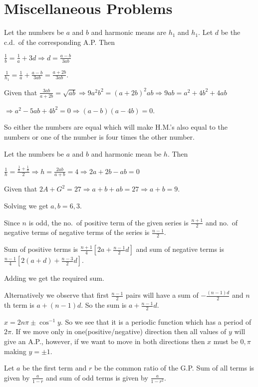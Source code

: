 \chapter{Miscellaneous Problems}
\startitemize[n, 1*broad]
\item Let the numbers be $a$ and $b$ and harmonic means are $h_1$ and $h_1$. Let $d$ be the c.d.\ of the
  corresponding A.P. Then

  $\frac{1}{b} = \frac{1}{a} + 3d\Rightarrow d = \frac{a - b}{3ab}$

  $\frac{1}{h_1} = \frac{1}{a} + \frac{a - b}{3ab} = \frac{a + 2b}{3ab}$.

  Given that $\frac{3ab}{a + 2b} = \sqrt{ab}\Rightarrow 9a^2b^2 = (a + 2b)^2ab \Rightarrow 9ab = a^2 + 4b^2
  + 4ab$

  $\Rightarrow a^2 - 5ab + 4b^2 = 0 \Rightarrow (a - b)(a - 4b) = 0$.

  So either the numbers are equal which will make H.M.'s also equal to the numbers or one of the number is
  four times the other number.
\item Let the numbers be $a$ and $b$ and harmonic mean be $h$. Then

  $\frac{1}{h} = \frac{\frac{1}{a} + \frac{1}{b}}{2} \Rightarrow h = \frac{2ab}{a + b} = 4 \Rightarrow 2a +
  2b - ab = 0$

  Given that $2A + G^2 = 27 \Rightarrow a + b + ab = 27 \Rightarrow a + b = 9$.

  Solving we get $a, b = 6, 3$.
\item Since $n$ is odd, the no.\ of positive term of the given series is $\frac{n + 1}{2}$ and no.\ of
  negative terms of negative terms of the series is $\frac{n - 1}{2}$.

  Sum of positive terms is $\frac{n + 1}{4}\left[2a + \frac{n - 1}{2}d\right]$ and sum of negative terms is
  $\frac{n - 1}{4}\left[2(a + d) + \frac{n - 3}{2}d\right]$.

  Adding we get the required sum.

  Alternatively we observe that first $\frac{n- 1}{2}$ pairs will have a sum of $-\frac{(n - 1)d}{2}$ and
  $n$th term is $a + (n- 1)d$. So the sum is $a + \frac{n - 1}{2}d$.
\item $x = 2n\pi\pm \cos^{-1}y$. So we see that it is a periodic function which has a period of $2\pi$. If
  we move only in one(positive/negative) direction then all values of $y$ will give an A.P., however, if we
  want to move in both directions then $x$ must be $0, \pi$ making $y = \pm1$.
\item Let $a$ be the first term and $r$ be the common ratio of the G.P. Sum of all terms is given by
  $\frac{a}{1 - r}$ and sum of odd terms is given by $\frac{a}{1 - r^2}$.

